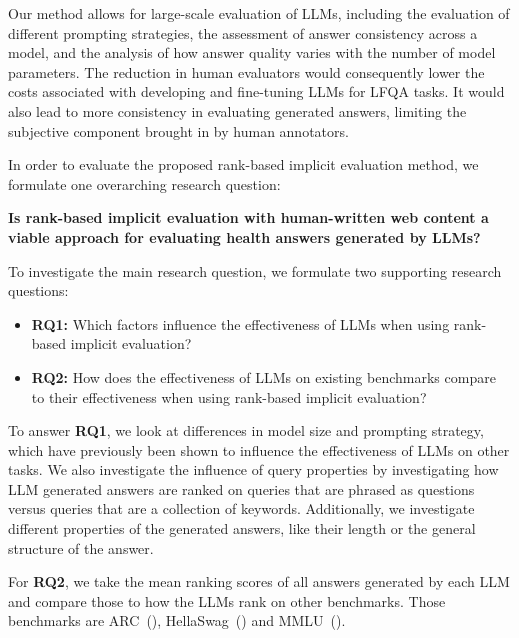 Our method allows for large-scale evaluation of LLMs, including the evaluation of different prompting strategies, the assessment of answer consistency across a model, and the analysis of how answer quality varies with the number of model parameters.
The reduction in human evaluators would consequently lower the costs associated with developing and fine-tuning LLMs for LFQA tasks.
It would also lead to more consistency in evaluating generated answers, limiting the subjective component brought in by human annotators.

In order to evaluate the proposed rank-based implicit evaluation method, we formulate one overarching research question:

\begin{center}
\textbf{Is rank-based implicit evaluation with human-written web content a viable approach for evaluating health answers generated by LLMs?}
\end{center}

To investigate the main research question, we formulate two supporting research questions:

\begin{itemize}
    \item \textbf{RQ1:} Which factors influence the effectiveness of LLMs when using rank-based implicit evaluation?
    \item \textbf{RQ2:} How does the effectiveness of LLMs on existing benchmarks compare to their effectiveness when using rank-based implicit evaluation?
\end{itemize}

To answer \textbf{RQ1}, we look at differences in model size and prompting strategy, which have previously been shown to influence the effectiveness of LLMs on other tasks.
We also investigate the influence of query properties by investigating how LLM generated answers are ranked on queries that are phrased as questions versus queries that are a collection of keywords.
Additionally, we investigate different properties of the generated answers, like their length or the general structure of the answer.

For \textbf{RQ2}, we take the mean ranking scores of all answers generated by each LLM and compare those to how the LLMs rank on other benchmarks.
Those benchmarks are ARC~(\cite{clark:2018:Think}), HellaSwag~(\cite{zellers:2019:HellaSwag}) and MMLU~(\cite{hendrycks:2020:Measuring}).

